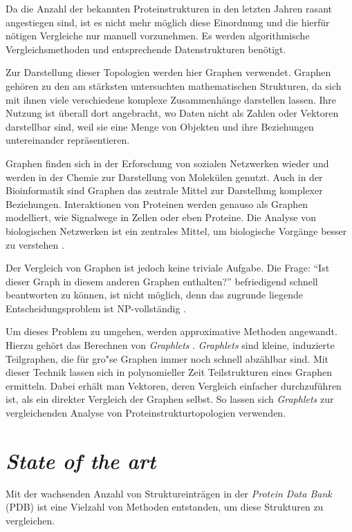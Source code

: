 \documentclass{report}
\begin{document}
Da die Anzahl der bekannten Proteinstrukturen in den letzten Jahren rasant angestiegen sind, ist es nicht mehr m\"oglich diese Einordnung und die hierf\"ur n\"otigen Vergleiche nur manuell vorzunehmen. Es werden algorithmische Vergleichsmethoden und entsprechende Datenstrukturen ben\"otigt.

Zur Darstellung dieser Topologien werden hier Graphen verwendet. Graphen geh\"oren zu den am st\"arksten untersuchten mathematischen Strukturen, da sich mit ihnen viele verschiedene komplexe Zusammenh\"ange darstellen lassen. Ihre Nutzung ist \"uberall dort angebracht, wo Daten nicht als Zahlen oder Vektoren darstellbar sind, weil sie eine Menge von Objekten und ihre Beziehungen untereinander repr\"asentieren.


Graphen finden sich in der Erforschung von sozialen Netzwerken wieder und werden in der Chemie zur Darstellung von Molek\"ulen genutzt. Auch in der Bioinformatik sind Graphen das zentrale Mittel zur Darstellung komplexer Beziehungen. Interaktionen von Proteinen werden genauso als Graphen modelliert, wie Signalwege in Zellen oder eben Proteine. Die Analyse von biologischen Netzwerken ist ein zentrales Mittel, um biologische Vorg\"ange besser zu verstehen \cite{junker2011analysis}.

Der Vergleich von Graphen ist jedoch keine triviale Aufgabe. Die Frage: "`Ist dieser Graph in diesem anderen Graphen enthalten?"' befriedigend schnell beantworten zu k\"onnen, ist nicht m\"oglich, denn das zugrunde liegende Entscheidungsproblem ist NP-vollst\"andig \cite{karp1972reducibility}.

Um dieses Problem zu umgehen, werden approximative Methoden angewandt. Hierzu geh\"ort das Berechnen von \textit{Graphlets} \cite{frqdistribution}. \textit{Graphlets} sind kleine, induzierte Teilgraphen, die f\"ur gro"se Graphen immer noch schnell abz\"ahlbar sind. Mit dieser Technik lassen sich in polynomieller Zeit Teilstrukturen eines Graphen ermitteln. Dabei erh\"alt man Vektoren, deren Vergleich einfacher durchzuf\"uhren ist, als ein direkter Vergleich der Graphen selbst. So lassen sich \textit{Graphlets} zur vergleichenden Analyse von Proteinstrukturtopologien verwenden.




\section{\textit{State of the art}}

Mit der wachsenden Anzahl von Struktureintr\"agen in der \textit{Protein Data Bank} (PDB) ist eine Vielzahl von Methoden entstanden, um diese Strukturen zu vergleichen.
\end{document}

